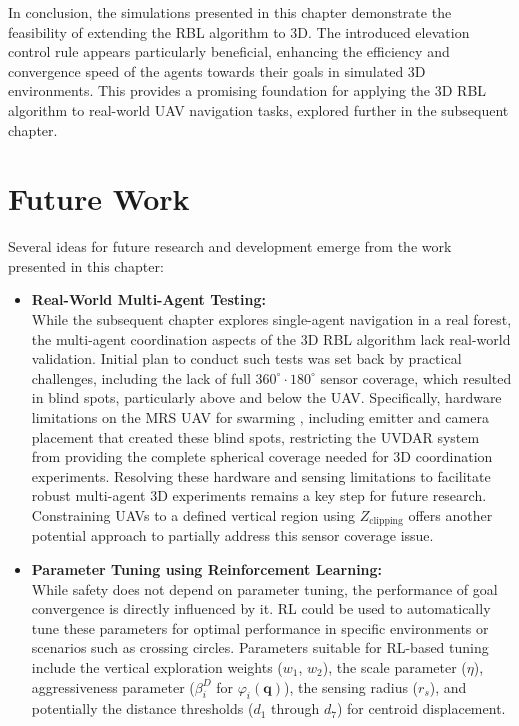         In conclusion, the simulations presented in this chapter demonstrate the feasibility of extending the \ac{RBL} algorithm to 3D. 
        The introduced elevation control rule appears particularly beneficial, enhancing the efficiency and convergence speed of the agents towards their goals in simulated 3D environments. 
        This provides a promising foundation for applying the 3D \ac{RBL} algorithm to real-world \ac{UAV} navigation tasks, explored further in the subsequent chapter.
    
    \section{Future Work}
        Several ideas for future research and development emerge from the work presented in this chapter:
        \begin{itemize}
            \item \textbf{Real-World Multi-Agent Testing: } \\
            While the subsequent chapter explores single-agent navigation in a real forest, the multi-agent coordination aspects of the 3D \ac{RBL} algorithm lack real-world validation. 
            Initial plan to conduct such tests was set back by practical challenges, including the lack of full $360^{\circ} \cdot 180^{\circ}$ sensor coverage, which resulted in blind spots, particularly above and below the \ac{UAV}.
            Specifically, hardware limitations on the \ac{MRS} \ac{UAV} for swarming \cite{robofly}, including emitter and camera placement that created these blind spots, restricting the UVDAR system \cite{uvdar_package} from providing the complete spherical coverage needed for 3D coordination experiments.
            Resolving these hardware and sensing limitations to facilitate robust multi-agent 3D experiments remains a key step for future research.
            Constraining \ac{UAV}s to a defined vertical region using $Z_{\text{clipping}}$ offers another potential approach to partially address this sensor coverage issue.
            \item \textbf{Parameter Tuning using Reinforcement Learning: } \\
            While safety does not depend on parameter tuning, the performance of goal convergence is directly influenced by it.
            \ac{RL} could be used to automatically tune these parameters for optimal performance in specific environments or scenarios such as crossing circles. 
            Parameters suitable for \ac{RL}-based tuning include the vertical exploration weights ($w_1$, $w_2$), the scale parameter ($\eta$), aggressiveness parameter ($\beta_i^D$ for $\varphi_i(\mathbf{q})$), the sensing radius ($r_s$), and potentially the distance thresholds ($d_1$ through $d_7$) for centroid displacement.

\end{itemize}
